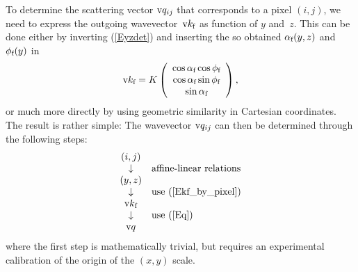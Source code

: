 To determine the scattering vector $\text{v}{q}_{ij}$ 
that corresponds to a pixel $(i,j)$,
we need to express the outgoing wavevector~$\text{v}{k}_{\text{f}}$ as function of $y$ and~$z$.
This can be done either by inverting (\ref{Eyzdet})
and inserting the so obtained $\alpha_{\text{f}}(y,z)$ and $\phi_{\text{f}}(y)$ in
\begin{equation}\label{Ekf_by_angle}
  \text{v}{k}_{\text{f}}=K\left(\begin{array}{c}
   \cos\alpha_{\text{f}}\cos\phi_{\text{f}}\\
   \cos\alpha_{\text{f}}\sin\phi_{\text{f}}\\
   \sin\alpha_{\text{f}}\end{array}\right),
\end{equation}
or much more directly by using geometric similarity in Cartesian coordinates.
The result is rather simple:
The wavevector $\text{v}{q}_{ij}$ can then be determined through the following steps:
\begin{equation}\label{Eqalgo}
  \begin{array}{cl}
      (i,j)&\\
      \downarrow&\mbox{affine-linear relations}\\
      (y,z)\\
      \downarrow&\mbox{use (\protect\ref{Ekf_by_pixel})}\\
      \text{v}{k}_{\text{f}}&\\
      \downarrow&\mbox{use (\protect\ref{Eq})}\\
      \text{v}{q}&\\
  \end{array}
\end{equation}
where the first step is mathematically trivial,
but requires an experimental calibration of the origin of the $(x,y)$ scale.


